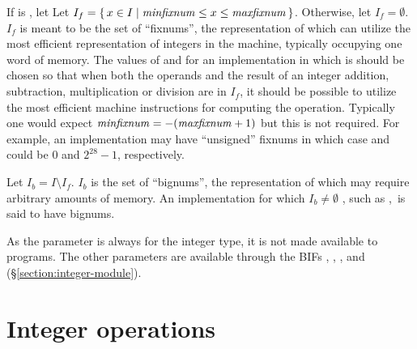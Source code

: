 \ifStd If  is , let \fi
\ifOld Let \fi
$I_f = \{\,x\in I \mid {\it minfixnum} \leq x \leq {\it maxfixnum}\,\}$.
\ifStd
Otherwise, let $I_f = \emptyset$.
\fi
$I_f$ is
\ifStd meant to be \fi
the set of ``fixnums'', the representation of which can utilize the
most efficient representation of integers in the machine, typically occupying
one word of memory.
\ifStd
The values of  and  for an implementation in which
 is  should be chosen
so that when both the operands and the result of an integer addition,
subtraction, multiplication or division are in $I_f$, it should be
possible to utilize the most efficient machine instructions for
computing the operation.  Typically one would expect ${\it minfixnum} =
-({\it maxfixnum}+1)$ but this is not required. For example, an
implementation may have ``unsigned'' fixnums in which case
 and  could be $0$ and $2^{28}-1$,
respectively.
\fi
{}

Let $I_b = I \setminus I_f$.
$I_b$ is the set of ``bignums'', the representation of which
may require arbitrary amounts of memory.
An implementation for which $I_b\neq\emptyset$
\ifOld, such as \Erlang,\fi\ is said to have bignums.

\ifStd
As the parameter  is always  for the integer type,
it is not made available to programs.  The other parameters are
available through the BIFs
, ,
,
 and
 (\S\ref{section:integer-module}).
\fi
{}

\section{Integer operations}

\label{section:integer-operations}

